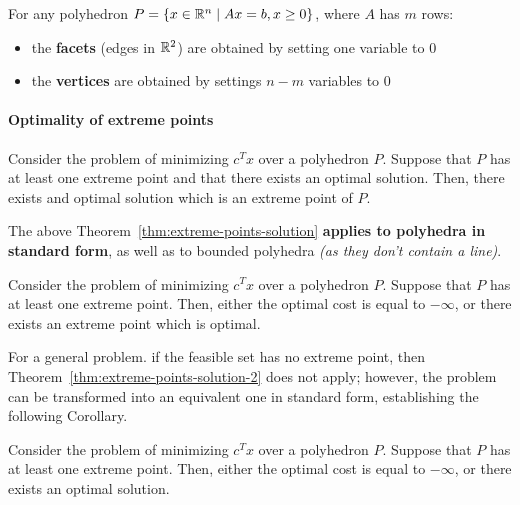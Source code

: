 \documentclass[english]{article}
\begin{document}
\bigskip
\begin{property}
  For any polyhedron \(P = \left\{ x \in \mathbb{R}^n \mid   Ax = b, x \geq 0 \right\}\), where \(A\) has \(m\) rows:

  \begin{itemize}
    \item the \textbf{facets} (edges in \(\mathbb{R}^2\)) are obtained by setting one variable to \(0\)
    \item the \textbf{vertices} are obtained by settings \(n-m\) variables to \(0\)
  \end{itemize}
\end{property}

\paragraph{Optimality of extreme points}

\begin{theorem}
  Consider the \LP problem of minimizing \(c^T x\) over a polyhedron \(P\).
  Suppose that \(P\) has at least one extreme point and that there exists an optimal solution.
  Then, there exists and optimal solution which is an extreme point of \(P\).
  \label{thm:extreme-points-solution}
\end{theorem}

The above Theorem~\ref{thm:extreme-points-solution} \textbf{applies to polyhedra in standard form}, as well as to bounded polyhedra \textit{(as they don't contain a line)}.

\begin{theorem}
  Consider the \LP problem of minimizing \(c^T x\) over a polyhedron \(P\).
  Suppose that \(P\) has at least one extreme point.
  Then, either the optimal cost is equal to \(-\infty\), or there exists an extreme point which is optimal.
  \label{thm:extreme-points-solution-2}
\end{theorem}

For a general \LP problem. if the feasible set has no extreme point, then Theorem~\ref{thm:extreme-points-solution-2} does not apply;
however, the problem can be transformed into an equivalent one in standard form, establishing the following Corollary.

\begin{corollary}
  Consider the \LP problem of minimizing \(c^T x\) over a polyhedron \(P\).
  Suppose that \(P\) has at least one extreme point.
  Then, either the optimal cost is equal to \(-\infty\), or there exists an optimal solution.
  \label{cor:extreme-point-solution-2}
\end{corollary}
\end{document}
